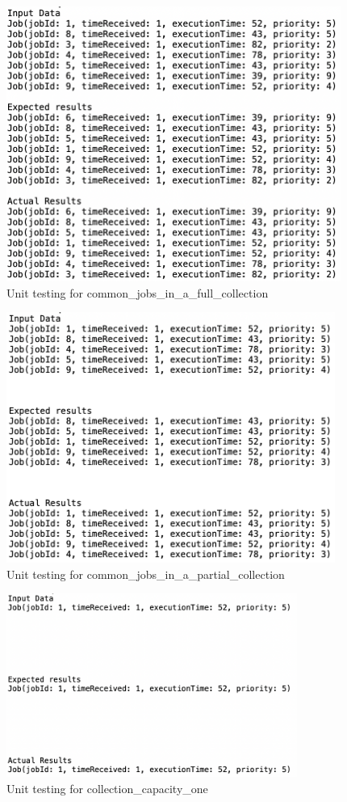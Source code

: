 \documentclass[a4paper]{article}
\begin{document}
\begin{figure}[H]
   \includegraphics[height=9cm]{images/Priority-common_jobs_in_a_full_collection.png}
   \caption{Unit testing for common\_jobs\_in\_a\_full\_collection}
\end{figure}

\begin{figure}[H]
   \includegraphics[height=8.2cm]{images/Priority-common_jobs_in_a_partial_collection.png}
   \caption{Unit testing for common\_jobs\_in\_a\_partial\_collection}
\end{figure}

\begin{figure}[H]
   \includegraphics[height=6cm]{images/Priority-collection_capacity_one.png}
   \caption{Unit testing for collection\_capacity\_one}
\end{figure}
\end{document}
